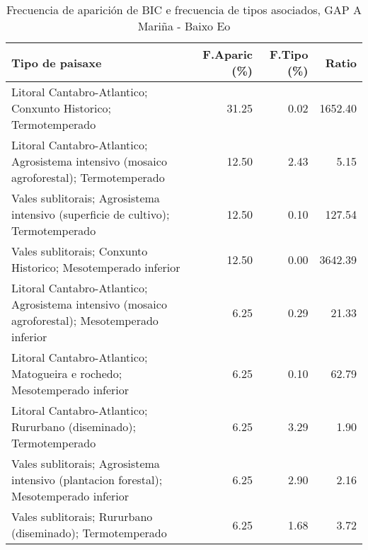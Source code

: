 \begin{table}[p]
\centering
\caption{Frecuencia de aparición de BIC e frecuencia de tipos asociados, GAP A Mariña - Baixo Eo} 
\label{vbic2}
\begin{tabular}{lrrr}
  \hline
Tipo de paisaxe & F.Aparic (\%) & F.Tipo (\%) & Ratio \\ 
  \hline
Litoral Cantabro-Atlantico; Conxunto Historico; Termotemperado & 31.25 & 0.02 & 1652.40 \\ 
  Litoral Cantabro-Atlantico; Agrosistema intensivo (mosaico agroforestal); Termotemperado & 12.50 & 2.43 & 5.15 \\ 
  Vales sublitorais; Agrosistema intensivo (superficie de cultivo); Termotemperado & 12.50 & 0.10 & 127.54 \\ 
  Vales sublitorais; Conxunto Historico; Mesotemperado inferior & 12.50 & 0.00 & 3642.39 \\ 
  Litoral Cantabro-Atlantico; Agrosistema intensivo (mosaico agroforestal); Mesotemperado inferior & 6.25 & 0.29 & 21.33 \\ 
  Litoral Cantabro-Atlantico; Matogueira e rochedo; Mesotemperado inferior & 6.25 & 0.10 & 62.79 \\ 
  Litoral Cantabro-Atlantico; Rururbano (diseminado); Termotemperado & 6.25 & 3.29 & 1.90 \\ 
  Vales sublitorais; Agrosistema intensivo (plantacion forestal); Mesotemperado inferior & 6.25 & 2.90 & 2.16 \\ 
  Vales sublitorais; Rururbano (diseminado); Termotemperado & 6.25 & 1.68 & 3.72 \\ 
   \hline
\end{tabular}
\end{table}
